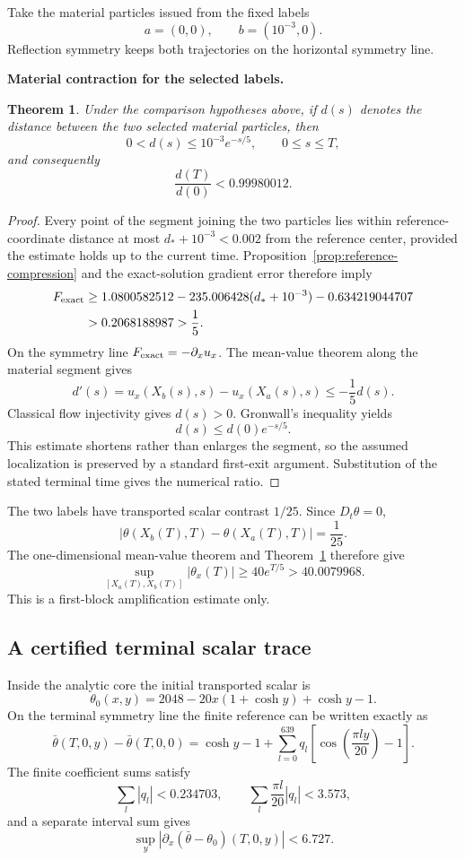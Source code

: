 \documentclass[11pt]{article}
\newtheorem{theorem}{Theorem}[section]\newtheorem{proposition}[theorem]{Proposition}
\theoremstyle{definition}\newtheorem{definition}[theorem]{Definition}\newtheorem{problem}[theorem]{Problem}
\theoremstyle{remark}\newtheorem{remark}[theorem]{Remark}
\begin{document}
Take the material particles issued from the fixed labels
\[
a=(0,0),\qquad b=(10^{-3},0).
\]
Reflection symmetry keeps both trajectories on the horizontal symmetry line.

\medskip
\noindent\textbf{Material contraction for the selected labels.}
\begin{theorem}\label{thm:label-contraction}
Under the comparison hypotheses above, if $d(s)$ denotes the distance between the two selected material particles, then
\[
0<d(s)\le10^{-3}e^{-s/5},\qquad0\le s\le T,
\]
and consequently
\[
\frac{d(T)}{d(0)}<0.99980012.
\]
\end{theorem}
\begin{proof}
Every point of the segment joining the two particles lies within reference-coordinate distance at most $d_*+10^{-3}<0.002$ from the reference center, provided the estimate holds up to the current time.  Proposition~\ref{prop:reference-compression} and the exact-solution gradient error therefore imply
\[
\begin{aligned}
F_{\rm exact}
&\ge1.0800582512
-235.006428(d_*+10^{-3})-0.634219044707\\
&>0.2068188987>\frac15.
\end{aligned}
\]
On the symmetry line $F_{\rm exact}=-\partial_xu_x$.  The mean-value theorem along the material segment gives
\[
d'(s)=u_x(X_b(s),s)-u_x(X_a(s),s)
\le-\frac15d(s).
\]
Classical flow injectivity gives $d(s)>0$.  Gronwall's inequality yields
\[
d(s)\le d(0)e^{-s/5}.
\]
This estimate shortens rather than enlarges the segment, so the assumed localization is preserved by a standard first-exit argument.  Substitution of the stated terminal time gives the numerical ratio.
\end{proof}

The two labels have transported scalar contrast $1/25$.  Since $D_t\theta=0$,
\[
|\theta(X_b(T),T)-\theta(X_a(T),T)|=\frac1{25}.
\]
The one-dimensional mean-value theorem and Theorem~\ref{thm:label-contraction} therefore give
\[
\sup_{[X_a(T),X_b(T)]}|\theta_x(T)|
\ge40e^{T/5}>40.0079968.
\]
This is a first-block amplification estimate only.

\subsection{A certified terminal scalar trace}
Inside the analytic core the initial transported scalar is
\[
\theta_0(x,y)=2048-20x(1+\cosh y)+\cosh y-1.
\]
On the terminal symmetry line the finite reference can be written exactly as
\[
\bar\theta(T,0,y)-\bar\theta(T,0,0)
=\cosh y-1+
\sum_{l=0}^{639}q_l
\left[\cos\left(\frac{\pi ly}{20}\right)-1\right].
\]
The finite coefficient sums satisfy
\[
\sum_l|q_l|<0.234703,\qquad
\sum_l\frac{\pi l}{20}|q_l|<3.573,
\]
and a separate interval sum gives
\[
\sup_y|\partial_x(\bar\theta-\theta_0)(T,0,y)|<6.727.
\]
\end{document}
